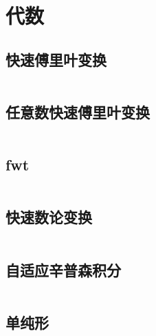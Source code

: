 \chapter{代数}
\section{快速傅里叶变换}
\inputminted{cpp}{\source/algebra/fast-fourier-transform.cpp}
\section{任意数快速傅里叶变换}
\inputminted{cpp}{\source/algebra/fft_mod_any.cpp}
\section{fwt}
\inputminted{cpp}{\source/algebra/fwt.cpp}
\section{快速数论变换}
\inputminted{cpp}{\source/algebra/number-theory-transform.cpp}
\section{自适应辛普森积分}
\inputminted{cpp}{\source/algebra/adaptive-simpsons-method.cpp}
\section{单纯形}
\inputminted{cpp}{\source/algebra/simplex.cpp}
